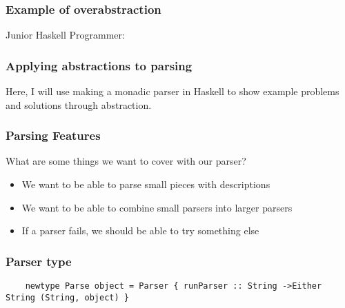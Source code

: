 \documentclass{beamer}
\begin{document}
\begin{frame}
\frametitle{Example of overabstraction}
Junior Haskell Programmer:










\end{frame}


\begin{frame}
\frametitle{Applying abstractions to parsing}
  Here, I will use making a monadic parser in Haskell 
  to show example problems and solutions through abstraction.
\end{frame}


\begin{frame}

\frametitle{Parsing Features}
  What are some things we want to cover with our parser?
  \begin{itemize}
    \item We want to be able to parse small pieces with descriptions
    \item We want to be able to combine small parsers into larger parsers
    \item If a parser fails, we should be able to try something else
  \end{itemize}

\end{frame}


\begin{frame}
\frametitle{Parser type}

  \begin{lstlisting}
    newtype Parse object = Parser { runParser :: String ->Either String (String, object) }
  \end{lstlisting}

\end{frame}
\end{document}
